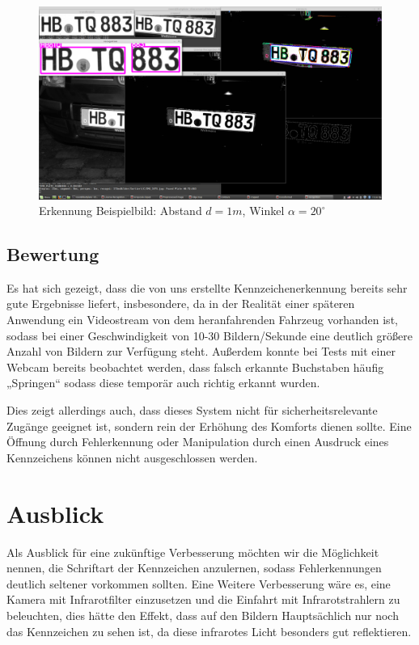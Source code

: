 \documentclass{../Vorlage/sebDenCls}
\begin{document}
\begin{figure}[htp]
	\centering 	
	\includegraphics[width=.9\textwidth]{Funktioniert_1975.png} 
	\caption{Erkennung Beispielbild: Abstand $d=1m$, Winkel $\alpha = 20^\circ$ \label{beispiel2}}
\end{figure}


\subsection{Bewertung}
Es hat sich gezeigt, dass die von uns erstellte Kennzeichenerkennung bereits sehr gute Ergebnisse liefert, insbesondere, da in der Realität einer späteren Anwendung ein Videostream von dem heranfahrenden Fahrzeug vorhanden ist, sodass bei einer Geschwindigkeit von 10-30 Bildern/Sekunde eine deutlich größere Anzahl von Bildern zur Verfügung steht. Außerdem konnte bei Tests mit einer Webcam bereits beobachtet werden, dass falsch erkannte Buchstaben häufig „Springen“ sodass diese temporär auch richtig erkannt wurden. 

Dies zeigt allerdings auch, dass dieses System nicht für sicherheitsrelevante Zugänge geeignet ist, sondern rein der Erhöhung des Komforts dienen sollte. Eine Öffnung durch Fehlerkennung oder Manipulation durch einen Ausdruck eines Kennzeichens können nicht ausgeschlossen werden.
\section{Ausblick}
Als Ausblick für eine zukünftige Verbesserung möchten wir die Möglichkeit nennen, die Schriftart der Kennzeichen anzulernen, sodass Fehlerkennungen deutlich seltener vorkommen sollten.
Eine Weitere Verbesserung wäre es, eine Kamera mit Infrarotfilter einzusetzen und die Einfahrt mit Infrarotstrahlern zu beleuchten, dies hätte den Effekt, dass auf den Bildern Hauptsächlich nur noch das Kennzeichen zu sehen ist, da diese infrarotes Licht besonders gut reflektieren.
\end{document}
